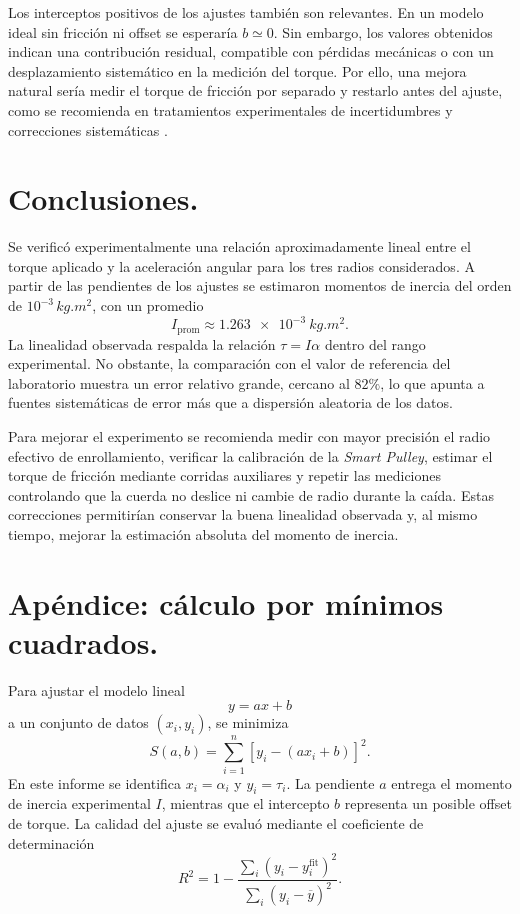 \documentclass[11pt,twocolumn]{article}
\makeatletter
\let\orig@parencite\parencite
\renewcommand{\parencite}[1]{\textcolor{Blue}{\orig@parencite{#1}}}
\renewcommand{\cite}[1]{\parencite{#1}}
\makeatother
\begin{document}
Los interceptos positivos de los ajustes también son relevantes. En un modelo ideal sin fricción ni offset se esperaría $b\simeq0$. Sin embargo, los valores obtenidos indican una contribución residual, compatible con pérdidas mecánicas o con un desplazamiento sistemático en la medición del torque. Por ello, una mejora natural sería medir el torque de fricción por separado y restarlo antes del ajuste, como se recomienda en tratamientos experimentales de incertidumbres y correcciones sistemáticas \cite{taylor1997}.

\section{Conclusiones.}

Se verificó experimentalmente una relación aproximadamente lineal entre el torque aplicado y la aceleración angular para los tres radios considerados. A partir de las pendientes de los ajustes se estimaron momentos de inercia del orden de $10^{-3}\,\si{kg.m^2}$, con un promedio
\begin{equation*}
    I_{\mathrm{prom}}\approx \SI{1.263e-3}{kg.m^2}.
\end{equation*}
La linealidad observada respalda la relación $\tau=I\alpha$ dentro del rango experimental. No obstante, la comparación con el valor de referencia del laboratorio muestra un error relativo grande, cercano al $82\%$, lo que apunta a fuentes sistemáticas de error más que a dispersión aleatoria de los datos.

Para mejorar el experimento se recomienda medir con mayor precisión el radio efectivo de enrollamiento, verificar la calibración de la \textit{Smart Pulley}, estimar el torque de fricción mediante corridas auxiliares y repetir las mediciones controlando que la cuerda no deslice ni cambie de radio durante la caída. Estas correcciones permitirían conservar la buena linealidad observada y, al mismo tiempo, mejorar la estimación absoluta del momento de inercia.

\section*{Apéndice: cálculo por mínimos cuadrados.}

Para ajustar el modelo lineal
\begin{equation*}
    y=ax+b
\end{equation*}
a un conjunto de datos $(x_i,y_i)$, se minimiza
\begin{equation*}
    S(a,b)=\sum_{i=1}^{n}\left[y_i-(ax_i+b)\right]^2.
\end{equation*}
En este informe se identifica $x_i=\alpha_i$ y $y_i=\tau_i$. La pendiente $a$ entrega el momento de inercia experimental $I$, mientras que el intercepto $b$ representa un posible offset de torque. La calidad del ajuste se evaluó mediante el coeficiente de determinación
\begin{equation*}
    R^2=1-\frac{\sum_i (y_i-y_i^{\mathrm{fit}})^2}{\sum_i (y_i-\overline{y})^2}.
\end{equation*}

\begingroup\scriptsize
\printbibliography[title={Referencias}]
\endgroup
\end{document}
